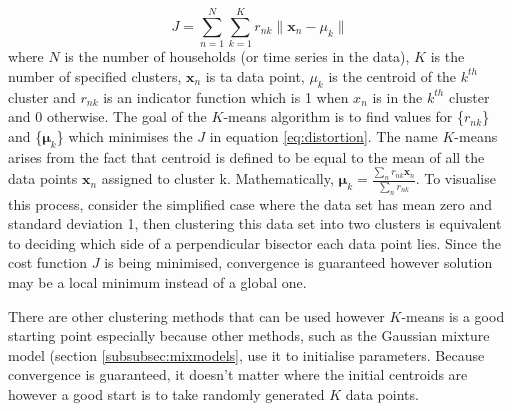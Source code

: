 \documentclass[a4paper]{article}
\begin{document}
\begin{equation} \label{eq:distortion}
J =\sum_{n=1}^{N} \sum_{k=1}^{K} r_{nk} \| \textbf{x}_n - \textbf{$\mu$}_k \|
\end{equation}
where $N$ is the number of households (or time series in the data), $K$ is the number of specified clusters, $\textbf{x}_n$ is ta data point, $\mu_k$ is the centroid of the $k^{th}$ cluster and $r_{nk}$ is an indicator function which is 1 when $x_n$ is in the $k^{th}$ cluster and 0 otherwise. The goal of the $K$-means algorithm is to find values for \{$r_{nk}$\} and \{$\boldsymbol \mu_k$\} which minimises the $J$ in equation \ref{eq:distortion}. The name $K$-means arises from the fact that centroid is defined to be equal to the mean of all the data points $\textbf{x}_n$ assigned to cluster k. Mathematically, $ \boldsymbol \mu_k = \frac{\sum_n r_{nk} \textbf{x}_n}{\sum_n r_{nk}}$. To visualise this process, consider the simplified case where the data set has mean zero and standard deviation 1, then clustering this data set into two clusters is equivalent to deciding which side of a perpendicular bisector each data point lies. Since the cost function $J$ is being minimised, convergence is guaranteed however solution may be a local minimum instead of a global one.

There are other clustering methods that can be used however $K$-means is a good starting point especially because other methods, such as the Gaussian mixture model (section \ref{subsubsec:mixmodels}, use it to initialise parameters. Because convergence is guaranteed, it doesn't matter where the initial centroids are however a good start is to take randomly generated $K$ data points.


\end{document}
